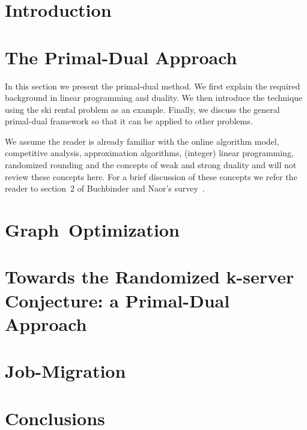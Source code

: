 \section{Introduction}
\label{intro}




\section{The Primal-Dual Approach}
\label{primal-dual}

In this section we present the primal-dual method.
We first explain the required background in linear programming and duality.
We then introduce the technique using the ski rental problem as an example.
Finally, we discuss the general primal-dual framework so that it can be applied to other problems.

We assume the reader is already familiar with the online algorithm model, competitive analysis, approximation algorithms, (integer) linear programming, randomized rounding and the concepts of weak and strong duality and will not review these concepts here.
For a brief discussion of these concepts we refer the reader to section~2 of Buchbinder and Naor's survey~\cite{buchbinder09:survey}.





\section{\mbox{Graph Optimization}}
\label{steiner-tree}


\section{Towards the Randomized k-server Conjecture: a Primal-Dual Approach}
\label{k-server}


\section{Job-Migration}
\label{job-migration}


\section{Conclusions}





